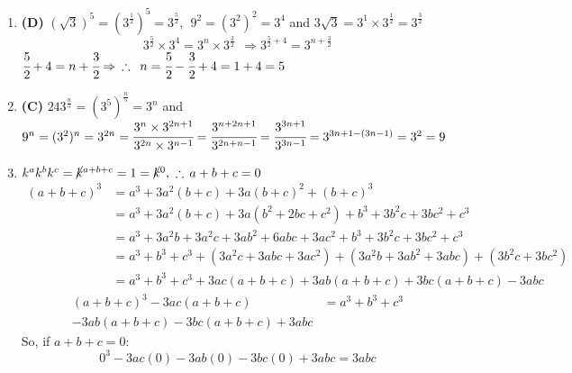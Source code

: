 \begin{multicols}{2}
\begin{enumerate}[label={\arabic*.}]
    \item \textbf{(D)} $(\sqrt{3})^5 = (3^{\frac{1}{2}})^5 = 3^{\frac{5}{2}}, \hspace{5pt} 9^2 =(3^2)^2 = 3^4  $ and $3\sqrt{3} = 3^1 \times 3^{\frac{1}{2}} = 3^{\frac{3}{2}}$ \\
        $$3^{\frac{5}{2}} \times 3^4 = 3^n \times 3^{\frac{3}{2}}\hspace{5pt} \Rightarrow 3^{\frac{5}{2} + 4} = 3^{n + \frac{3}{2}} $$ 
        $ \cfrac{5}{2} + 4 = n + \cfrac{3}{2} \Rightarrow \hspace{5pt} \therefore \hspace{5pt} n = \cfrac{5}{2} - \cfrac{3}{2} + 4 = 1 + 4 = 5  $
    \item \textbf{(C)} $243^{\frac{n}{5}} = (3^5)^{\frac{n}{5}} = 3^n$ and $9^n = (3^2)^n = 3^{2n} = \cfrac{3^n \times 3^{2n + 1}}{3^{2n} \times 3^{n-1}} = \cfrac{3^{n + 2n + 1}}{3^{2n + n -1}} = \cfrac{3^{3n + 1}}{3^{3n - 1}} = 3^{3n + 1 - (3n - 1)} = 3^2 = 9 $

    \item \( k^a k^b k^c = \cancel{k}^{a + b + c} = 1 = \cancel{k}^0, \,\, \therefore \, a + b + c = 0 \)
    \begin{align*} 
        (a + b + c)^3 &= a^3 + 3a^2(b + c) + 3a(b + c)^2 + (b + c)^3 \\
        &= a^3 + 3a^2(b + c) + 3a(b^2 + 2bc + c^2) + b^3 + 3b^2c + 3bc^2 + c^3 \\
        &= a^3 + 3a^2b + 3a^2c + 3ab^2 + 6abc + 3ac^2 + b^3 + 3b^2c + 3bc^2 + c^3 \\
        &= a^3 + b^3 + c^3 + (3a^2c + 3abc + 3ac^2) + (3a^2b + 3ab^2 + 3abc) + (3b^2c + 3bc^2) \\
        &= a^3 + b^3 + c^3 + 3ac(a + b + c) + 3ab(a + b + c) + 3bc(a + b + c) - 3abc
    \end{align*}
    \vspace{-20pt}
    \begin{align*}
    (a + b + c)^3 - 3ac(a + b + c) &= a^3 + b^3 + c^3 \\
    - 3ab(a + b + c) - 3bc(a + b + c) + 3abc
    \end{align*}
    So, if \( a + b + c = 0 \):
    \[0^3 - 3ac(0) - 3ab(0) - 3bc(0) + 3abc = 3abc\]


\end{enumerate}
\end{multicols}
